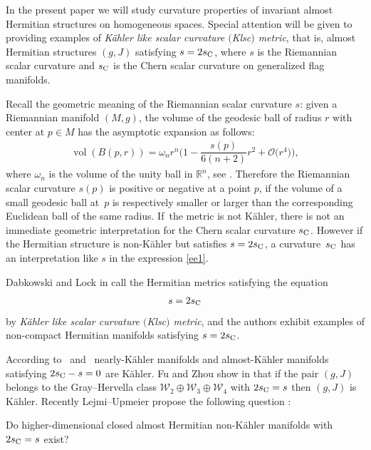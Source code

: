 \documentclass[pdftex]{sigma}%
\numberwithin{equation}{section}
\begin{document}
In the present paper we will study curvature properties of invariant almost Hermitian structures on homogeneous spaces. Special attention will be given to providing examples of {\em K\"ahler like scalar curvature $($Klsc$)$ metric}, that is, almost Hermitian structures $(g,J)$ satisfying $s=2s_{\rm C}$, where $s$ is the Riemannian scalar curvature and $s_{\rm C}$ is the Chern scalar curvature on generalized flag manifolds.

Recall the geometric meaning of the Riemannian scalar curvature $s$: given a Riemannian manifold $(M,g)$, the volume of the geodesic ball of radius $r$ with center at $p\in M$ has the asymptotic expansion as follows:
\begin{gather}\label{ee1}
\operatorname{vol}( B(p,r))=\omega_{n}r^{n}\bigg(1-\dfrac{s(p)}{6(n+2)}r^{2}+\mathcal{O}\big(r^{4}\big)\bigg),
\end{gather}
where $\omega_{n}$ is the volume of the unity ball in $\mathbb{R}^{n}$, see \cite{besse,lock}. Therefore the Riemannian scalar curvature $s(p)$ is positive or negative at a point $p$, if the volume of a small geodesic ball at~$p$ is respectively smaller or larger than the corresponding Euclidean ball of the same radius. If~the metric is not K\"ahler, there is not an immediate geometric interpretation for the Chern scalar curvature $s_{\rm C}$. However if the Hermitian structure is non-K\"ahler but satisfies $s=2s_{\rm C}$, a curvature~$s_{\rm C}$ has an interpretation like $s$ in the expression \eqref{ee1}.

Dabkowski and Lock in \cite{lock} call the Hermitian metrics satisfying the equation
\begin{gather*}
s=2s_{\rm C}
\end{gather*}
by {\it K\"ahler like scalar curvature $($Klsc$)$ metric}, and the authors exhibit examples of non-compact Hermitian manifolds satisfying $s=2s_{\rm C}$.

According to~\cite{apo} and~\cite{integra} nearly-K\"ahler manifolds and almost-K\"ahler manifolds satisfying $2s_{\rm C}-s=0$ are K\"ahler. Fu and Zhou show in \cite{fu} that if the pair $(g,J)$ belongs to the Gray--Hervella class $\mathcal{W}_{2}\oplus \mathcal{W}_{3}\oplus \mathcal{W}_{4}$ with $2s_{\rm C}=s$ then $(g,J)$ is K\"ahler. Recently Lejmi--Upmeier propose the following question \cite[Remark~3.3]{integra}:
\begin{Question} \label{question-princ}
Do higher-dimensional closed almost Hermitian non-K\"ahler manifolds with $2s_{\rm C}=s$ exist?
\end{Question}
\end{document}
